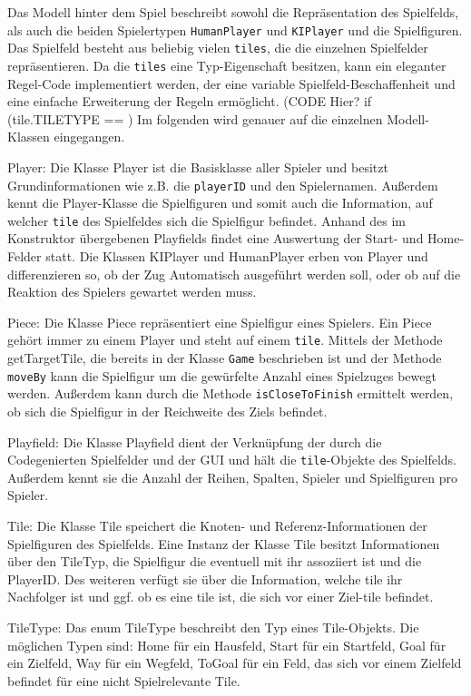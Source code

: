 \documentclass[conference]{IEEEtran}
\begin{document}
Das Modell hinter dem Spiel beschreibt sowohl die Repr\"asentation des Spielfelds, als auch die beiden Spielertypen \texttt{HumanPlayer} und \texttt{KIPlayer} und die Spielfiguren. Das Spielfeld besteht aus beliebig vielen \texttt{tiles}, die die einzelnen Spielfelder repr\"asentieren. Da die \texttt{tiles} eine Typ-Eigenschaft besitzen, kann ein eleganter Regel-Code implementiert werden, der eine variable Spielfeld-Beschaffenheit und eine einfache Erweiterung der Regeln erm\"oglicht. (CODE Hier?  if (tile.TILETYPE == ) 
Im folgenden wird genauer auf die einzelnen Modell-Klassen eingegangen.

Player: Die Klasse Player ist die Basisklasse aller Spieler und besitzt Grundinformationen wie z.B. die \texttt{playerID} und den Spielernamen. Außerdem kennt die Player-Klasse die Spielfiguren und somit auch die Information, auf welcher \texttt{tile} des Spielfeldes sich die Spielfigur befindet. Anhand des im Konstruktor \"ubergebenen Playfields findet eine Auswertung der Start- und Home-Felder statt. Die Klassen KIPlayer und HumanPlayer erben von Player und differenzieren so, ob der Zug Automatisch ausgef\"uhrt werden soll, oder ob auf die Reaktion des Spielers gewartet werden muss. 

Piece: Die Klasse Piece repr\"asentiert eine Spielfigur eines Spielers. Ein Piece gehört immer zu einem Player und steht auf einem \texttt{tile}. Mittels der Methode getTargetTile, die bereits in der Klasse \texttt{Game} beschrieben ist und der Methode \texttt{moveBy} kann die Spielfigur um die gewürfelte Anzahl eines Spielzuges bewegt werden. Au{\ss}erdem kann durch die Methode \texttt{isCloseToFinish} ermittelt werden, ob sich die Spielfigur in der Reichweite des Ziels befindet. 

Playfield: Die Klasse Playfield dient der Verkn\"upfung der durch die Codegenierten Spielfelder und der GUI und h\"alt die \texttt{tile}-Objekte des Spielfelds. Außerdem kennt sie die Anzahl der Reihen, Spalten, Spieler und Spielfiguren pro Spieler.

Tile: Die Klasse Tile speichert die Knoten- und Referenz-Informationen der Spielfiguren des Spielfelds. Eine Instanz der Klasse Tile besitzt Informationen über den TileTyp, die Spielfigur die eventuell mit ihr assoziiert ist und die PlayerID. Des weiteren verfügt sie über die Information, welche tile ihr Nachfolger ist und ggf. ob es eine tile ist, die sich vor einer Ziel-tile befindet. 

TileType: Das enum TileType beschreibt den Typ eines Tile-Objekts. Die m\"oglichen Typen sind: Home f\"ur ein Hausfeld, Start f\"ur ein Startfeld, Goal f\"ur ein Zielfeld, Way f\"ur ein Wegfeld, ToGoal f\"ur ein Feld, das sich vor einem Zielfeld befindet f\"ur eine nicht Spielrelevante Tile. 
\end{document}
